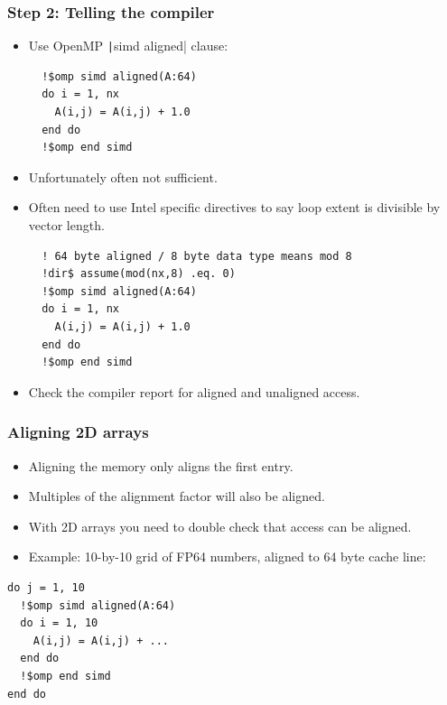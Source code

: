 \documentclass{beamer}
\begin{document}
\begin{frame}[fragile]
\frametitle{Step 2: Telling the compiler}
\begin{itemize}
  \item Use OpenMP \texttt|simd aligned| clause:
  \begin{verbatim}
  !$omp simd aligned(A:64)
  do i = 1, nx
    A(i,j) = A(i,j) + 1.0
  end do
  !$omp end simd
  \end{verbatim}
  \pause
  \item Unfortunately often not sufficient.
  \item Often need to use Intel specific directives to say loop extent is divisible by vector length.
  \begin{verbatim}
  ! 64 byte aligned / 8 byte data type means mod 8
  !dir$ assume(mod(nx,8) .eq. 0)
  !$omp simd aligned(A:64)
  do i = 1, nx
    A(i,j) = A(i,j) + 1.0
  end do
  !$omp end simd
  \end{verbatim}
  \item Check the compiler report for aligned and unaligned access.
\end{itemize}
\end{frame}

\begin{frame}[fragile]
\frametitle{Aligning 2D arrays}
\begin{itemize}
  \item Aligning the memory only aligns the first entry.
  \item Multiples of the alignment factor will also be aligned.
  \item With 2D arrays you need to double check that access can be aligned.
  \item Example: 10-by-10 grid of FP64 numbers, aligned to 64 byte cache line:
\end{itemize}

\begin{adjustbox}{max width={\textwidth}}
\end{adjustbox}

\begin{verbatim}
do j = 1, 10
  !$omp simd aligned(A:64)
  do i = 1, 10
    A(i,j) = A(i,j) + ...
  end do
  !$omp end simd
end do
\end{verbatim}

\end{frame}
\end{document}
